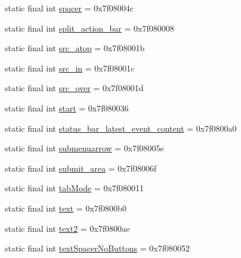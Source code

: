 \begin{CompactItemize}
\item 
static final int \hyperlink{classandroid_1_1support_1_1graphics_1_1drawable_1_1animated_1_1_r_1_1id_c68f3aca9eb976d222bb51701e7f8ee0}{spacer} = 0x7f08004c
\item 
static final int \hyperlink{classandroid_1_1support_1_1graphics_1_1drawable_1_1animated_1_1_r_1_1id_b7ad6d0ba025201d498953100bcee167}{split\_\-action\_\-bar} = 0x7f080008
\item 
static final int \hyperlink{classandroid_1_1support_1_1graphics_1_1drawable_1_1animated_1_1_r_1_1id_624d89dae66fe75a2dd7eb2e59089e4d}{src\_\-atop} = 0x7f08001b
\item 
static final int \hyperlink{classandroid_1_1support_1_1graphics_1_1drawable_1_1animated_1_1_r_1_1id_f28df49da14f9a3d1901ff075823e8d6}{src\_\-in} = 0x7f08001c
\item 
static final int \hyperlink{classandroid_1_1support_1_1graphics_1_1drawable_1_1animated_1_1_r_1_1id_69325ba27456617ac9d8d8de03a3633a}{src\_\-over} = 0x7f08001d
\item 
static final int \hyperlink{classandroid_1_1support_1_1graphics_1_1drawable_1_1animated_1_1_r_1_1id_76cb2a312cf535b997865035074ffae3}{start} = 0x7f080036
\item 
static final int \hyperlink{classandroid_1_1support_1_1graphics_1_1drawable_1_1animated_1_1_r_1_1id_5cc5f023156d1a3ae3159da6a778c772}{status\_\-bar\_\-latest\_\-event\_\-content} = 0x7f0800a0
\item 
static final int \hyperlink{classandroid_1_1support_1_1graphics_1_1drawable_1_1animated_1_1_r_1_1id_7a59494408ecf727a638f487025864e9}{submenuarrow} = 0x7f08005e
\item 
static final int \hyperlink{classandroid_1_1support_1_1graphics_1_1drawable_1_1animated_1_1_r_1_1id_aade2b3f8f217ed09f7cc6ef81bebca1}{submit\_\-area} = 0x7f08006f
\item 
static final int \hyperlink{classandroid_1_1support_1_1graphics_1_1drawable_1_1animated_1_1_r_1_1id_d48b4e10fb472ff83a1a0a745e47add2}{tabMode} = 0x7f080011
\item 
static final int \hyperlink{classandroid_1_1support_1_1graphics_1_1drawable_1_1animated_1_1_r_1_1id_9ec962799ed7ae73587b3d0370127b70}{text} = 0x7f0800b0
\item 
static final int \hyperlink{classandroid_1_1support_1_1graphics_1_1drawable_1_1animated_1_1_r_1_1id_546f410f7b4fb51dddc6764451a09c34}{text2} = 0x7f0800ae
\item 
static final int \hyperlink{classandroid_1_1support_1_1graphics_1_1drawable_1_1animated_1_1_r_1_1id_daccde4db1a7c0d45c2aac33acb24103}{textSpacerNoButtons} = 0x7f080052

\end{CompactItemize}
